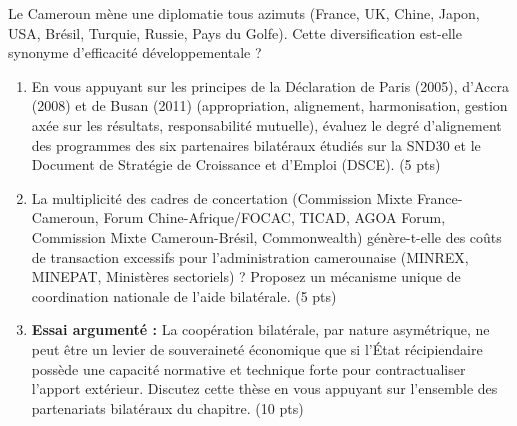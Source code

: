 \documentclass[11pt]{article}
\begin{document}
\begin{exercice}
Le Cameroun mène une diplomatie tous azimuts (France, UK, Chine, Japon, USA, Brésil, Turquie, Russie, Pays du Golfe). Cette diversification est-elle synonyme d'efficacité développementale ?
\begin{enumerate}
    \item En vous appuyant sur les principes de la Déclaration de Paris (2005), d'Accra (2008) et de Busan (2011) (appropriation, alignement, harmonisation, gestion axée sur les résultats, responsabilité mutuelle), évaluez le degré d'alignement des programmes des six partenaires bilatéraux étudiés sur la SND30 et le Document de Stratégie de Croissance et d'Emploi (DSCE). (5 pts)
    \item La multiplicité des cadres de concertation (Commission Mixte France-Cameroun, Forum Chine-Afrique/FOCAC, TICAD, AGOA Forum, Commission Mixte Cameroun-Brésil, Commonwealth) génère-t-elle des coûts de transaction excessifs pour l'administration camerounaise (MINREX, MINEPAT, Ministères sectoriels) ? Proposez un mécanisme unique de coordination nationale de l'aide bilatérale. (5 pts)
    \item \textbf{Essai argumenté :} \og La coopération bilatérale, par nature asymétrique, ne peut être un levier de souveraineté économique que si l'État récipiendaire possède une capacité normative et technique forte pour contractualiser l'apport extérieur. \fg Discutez cette thèse en vous appuyant sur l'ensemble des partenariats bilatéraux du chapitre. (10 pts)
\end{enumerate}
\end{exercice}
\end{document}
